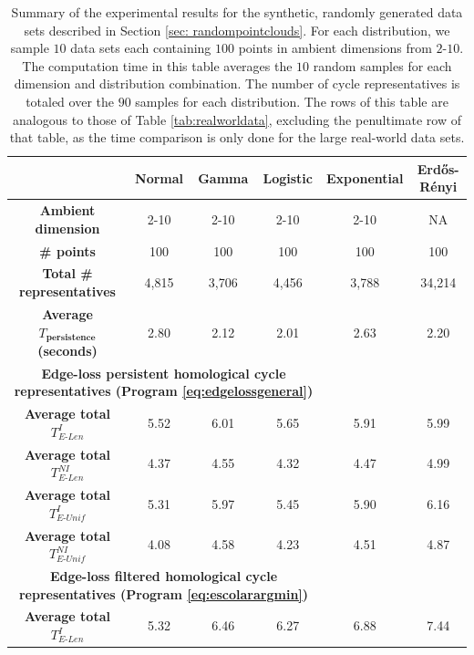 \documentclass[11pt,onecolumn]{article}
\newcommand{\tab}{Table }
\newcommand{\se}{Section }
\newcommand{\NI}{^{NI}}
\newcommand{\I}{^I}
\newcommand{\pr}{Program }
\newcommand{\EU}{_{E\text{-}Unif}}
\newcommand{\EL}{_{E\text{-}Len}}
\renewcommand{\arraystretch}{1.5}
\theoremstyle{plain}
\theoremstyle{definition}
\begin{document}
\setlength{\tabcolsep}{10pt}

\renewcommand{\arraystretch}{1.5}

\begin{table}[H]
\caption{Summary of the experimental results for the synthetic, randomly generated data sets described in \se \ref{sec: randompointclouds}. For each distribution, we sample $10$ data sets each containing $100$ points in ambient dimensions from $2$-$10$. The computation time in this table averages the $10$ random samples for each dimension and distribution combination. The number of cycle representatives is totaled over the $90$ samples for each distribution. The rows of this table are analogous to those of \tab \ref{tab:realworldata}, excluding the penultimate row of that table, as the time comparison is only done for the large real-world data sets. } 
\footnotesize
    \centering
    \begin{tabular}{ |c || c |c |c |c | c|}
 \hline
 & \textbf{Normal} & \textbf{Gamma}  & \textbf{Logistic} & \textbf{Exponential}  & \textbf{Erd\H{o}s-R\'enyi}  \\[0.5ex] 
 \hline 
 \hline
 \textbf{Ambient dimension} & 2-10 & 2-10    & 2-10 &  2-10 & NA \\\hline  
 \textbf{\# points} &  100 &  100  &  100 &   100 & 100 \\\hline  
  \textbf{Total \# representatives} & 4,815 & 3,706  & 4,456 & 3,788 & 34,214\\ \hline
 \textbf{Average  \textbf{$T_\textbf{persistence}$} (seconds)} &   2.80  & 2.12    & 2.01 & 2.63 
 & 2.20 \\  [0.5ex] \hline
\multicolumn{4}{c}{\textbf{Edge-loss persistent homological cycle representatives (\pr \eqref{eq:edgelossgeneral})}}  \\
\hline
 \textbf{Average total $T\I\EL$  } &5.52 & 6.01 & 5.65 & 5.91 & 5.99 \\ \hline
 \textbf{Average total $T\NI\EL$  } &  4.37 & 4.55 & 4.32 & 4.47 & 4.99\\ \hline 
 \textbf{Average total $T\I\EU$  } & 5.31 & 5.97 & 5.45 & 5.90 &6.16\\ \hline
 \textbf{Average total $T\NI\EU$  } & 4.08 & 4.58 & 4.23 & 4.51 & 4.87\\ 
 [0.5ex] 
\hline
\multicolumn{4}{c}{\textbf{Edge-loss filtered homological cycle representatives (\pr \eqref{eq:escolarargmin})}}  \\
\hline
 \textbf{Average total $T\I\EL$  } &5.32 & 6.46 & 6.27 & 6.88& 7.44\\ \hline

\end{tabular}
\end{table}
\end{document}
